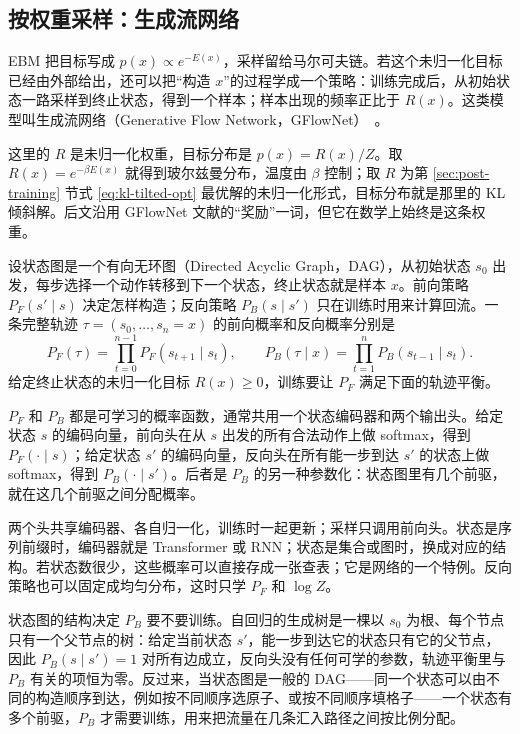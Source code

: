 \subsection{按权重采样：生成流网络}
\label{sec:gflownet}

EBM 把目标写成 \(p(x)\propto e^{-E(x)}\)，采样留给马尔可夫链。若这个未归一化目标已经由外部给出，还可以把“构造 \(x\)”的过程学成一个策略：训练完成后，从初始状态一路采样到终止状态，得到一个样本；样本出现的频率正比于 \(R(x)\)。这类模型叫生成流网络（Generative Flow Network，GFlowNet）~\cite{bengio2021gflownet}。

这里的 \(R\) 是未归一化权重，目标分布是 \(p(x)=R(x)/Z\)。取 \(R(x)=e^{-\beta E(x)}\) 就得到玻尔兹曼分布，温度由 \(\beta\) 控制；取 \(R\) 为第 \ref{sec:post-training} 节式 \eqref{eq:kl-tilted-opt} 最优解的未归一化形式，目标分布就是那里的 KL 倾斜解。后文沿用 GFlowNet 文献的“奖励”一词，但它在数学上始终是这条权重。

设状态图是一个有向无环图（Directed Acyclic Graph，DAG），从初始状态 \(s_0\) 出发，每步选择一个动作转移到下一个状态，终止状态就是样本 \(x\)。前向策略 \(P_F(s'\mid s)\) 决定怎样构造；反向策略 \(P_B(s\mid s')\) 只在训练时用来计算回流。一条完整轨迹 \(\tau=(s_0,\ldots,s_n=x)\) 的前向概率和反向概率分别是
\begin{equation}
 P_F(\tau)=\prod_{t=0}^{n-1}P_F(s_{t+1}\mid s_t),\qquad
 P_B(\tau\mid x)=\prod_{t=1}^{n}P_B(s_{t-1}\mid s_t).
 \label{eq:gfn-path-prob}
\end{equation}
给定终止状态的未归一化目标 \(R(x)\ge0\)，训练要让 \(P_F\) 满足下面的轨迹平衡。

\(P_F\) 和 \(P_B\) 都是可学习的概率函数，通常共用一个状态编码器和两个输出头。给定状态 \(s\) 的编码向量，前向头在从 \(s\) 出发的所有合法动作上做 softmax，得到 \(P_F(\cdot\mid s)\)；给定状态 \(s'\) 的编码向量，反向头在所有能一步到达 \(s'\) 的状态上做 softmax，得到 \(P_B(\cdot\mid s')\)。后者是 \(P_B\) 的另一种参数化：状态图里有几个前驱，就在这几个前驱之间分配概率。

两个头共享编码器、各自归一化，训练时一起更新；采样只调用前向头。状态是序列前缀时，编码器就是 Transformer 或 RNN；状态是集合或图时，换成对应的结构。若状态数很少，这些概率可以直接存成一张查表；它是网络的一个特例。反向策略也可以固定成均匀分布，这时只学 \(P_F\) 和 \(\log Z\)。

状态图的结构决定 \(P_B\) 要不要训练。自回归的生成树是一棵以 \(s_0\) 为根、每个节点只有一个父节点的树：给定当前状态 \(s'\)，能一步到达它的状态只有它的父节点，因此 \(P_B(s\mid s')=1\) 对所有边成立，反向头没有任何可学的参数，轨迹平衡里与 \(P_B\) 有关的项恒为零。反过来，当状态图是一般的 DAG——同一个状态可以由不同的构造顺序到达，例如按不同顺序选原子、或按不同顺序填格子——一个状态有多个前驱，\(P_B\) 才需要训练，用来把流量在几条汇入路径之间按比例分配。

